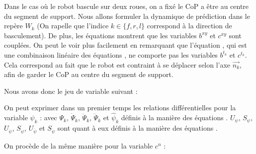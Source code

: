 				
					Dans le cas où le robot bascule sur deux roues, on a fixé le CoP a être au centre du segment de support.
					Nous allons formuler la dynamique de prédiction dans le repère $W_k$ (On rapelle que l'indice $k \in \{f, r, l\}$ correspond à la direction de basculement).
					De plus, les équations  montrent que les variables $b^{xy}$ et $c^{xy}$ sont couplées.
					On peut le voir plus facilement en remarquant que l'équation , qui est une combinaison linéaire des équations , ne comporte pas les variables $b^{t_k}$ et $c^{t_k}$.
					Cela correspond au fait que le robot est contraint à se déplacer selon l'axe $\vec{n_k}$, afin de garder le CoP au centre du segment de support.
					
					Nous avons donc le jeu de variable suivant :
					
					On peut exprimer dans un premier temps les relations différentielles pour la variable $\psi_k$ :
					avec $\Psi_k$, $\dot{\Psi}_k $, $\ddot{\Psi}_k$, $\dddot{\Psi}_k$ et $\hat{\psi}_k$ définis 
					à la manière des équations .
					$U_\psi$, $S_\psi$, $U_{\dot{\psi}}$, $S_{\dot{\psi}}$, $U_{\ddot{\psi}}$ et $S_{\ddot{\psi}}$ sont quant à eux définis à la manière des équations
					.
					
					On procède de la même manière pour la variable $c^n$ :
					
					
